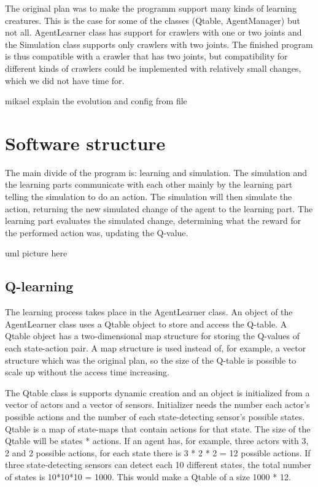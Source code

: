 \documentclass{article}
\begin{document}
The original plan was to make the programm support many kinds of learning
creatures. This is the case for some of the classes (Qtable, AgentManager)
but not all. AgentLearner class has support for crawlers with one or two joints
and the Simulation class supports only crawlers with two joints. The finished
program is thus compatible with a crawler that has two joints, but compatibility
for different kinds of crawlers could be implemented with relatively small
changes, which we did not have time for.



mikael explain the evolution and config from file



\section{Software structure}

The main divide of the program is: learning and simulation. The
simulation and the learning parts communicate with each other mainly by the
learning part telling the simulation to do an action. The simulation will then
simulate the action, returning the new simulated change of the agent to the
learning part. The learning part evaluates the simulated change, determining
what the reward for the performed action was, updating the Q-value.


uml picture here



\subsection{Q-learning}

The learning process takes place in the AgentLearner class.
An object of the AgentLearner
class uses a Qtable object to store and access the Q-table. A Qtable object
has a two-dimensional map structure for storing the Q-values of each
state-action pair. A map structure is used instead of, for example,
a vector structure which was the original plan, so the size of
the Q-table is possible to scale up without the access time increasing.

The Qtable class is supports dynamic creation and an object is initialized
from a vector of actors and a vector of sensors. Initializer needs
the number each actor's possible actions and the number of each
state-detecting sensor's possible states. Qtable is a map of
state-maps that contain actions for that state. The size of the Qtable
will be states * actions. If an agent has, for example, three actors
with 3, 2 and 2 possible actions, for each state there is
3 * 2 * 2 = 12 possible actions. If three state-detecting sensors can
detect each 10 different states, the total number of states is
10*10*10 = 1000. This would make a Qtable of a size 1000 * 12.
\end{document}
